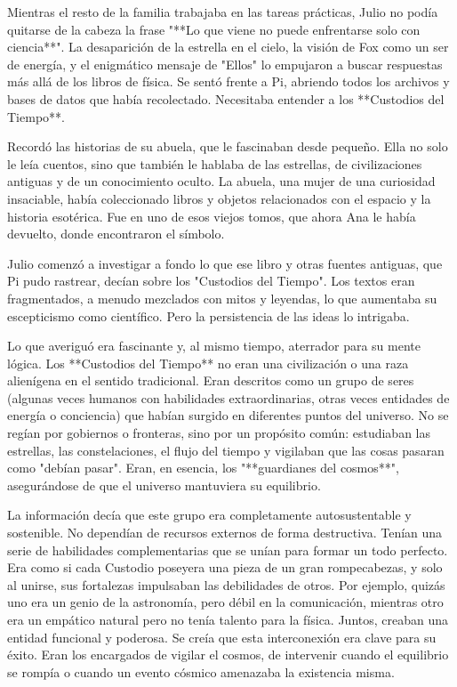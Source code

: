 \documentclass[a4paper,12pt]{book}
\begin{document}
Mientras el resto de la familia trabajaba en las tareas prácticas, Julio no podía quitarse de la cabeza la frase "**Lo que viene no puede enfrentarse solo con ciencia**". La desaparición de la estrella en el cielo, la visión de Fox como un ser de energía, y el enigmático mensaje de "Ellos" lo empujaron a buscar respuestas más allá de los libros de física. Se sentó frente a Pi, abriendo todos los archivos y bases de datos que había recolectado. Necesitaba entender a los **Custodios del Tiempo**.

Recordó las historias de su abuela, que le fascinaban desde pequeño. Ella no solo le leía cuentos, sino que también le hablaba de las estrellas, de civilizaciones antiguas y de un conocimiento oculto. La abuela, una mujer de una curiosidad insaciable, había coleccionado libros y objetos relacionados con el espacio y la historia esotérica. Fue en uno de esos viejos tomos, que ahora Ana le había devuelto, donde encontraron el símbolo.

Julio comenzó a investigar a fondo lo que ese libro y otras fuentes antiguas, que Pi pudo rastrear, decían sobre los "Custodios del Tiempo". Los textos eran fragmentados, a menudo mezclados con mitos y leyendas, lo que aumentaba su escepticismo como científico. Pero la persistencia de las ideas lo intrigaba.

Lo que averiguó era fascinante y, al mismo tiempo, aterrador para su mente lógica. Los **Custodios del Tiempo** no eran una civilización o una raza alienígena en el sentido tradicional. Eran descritos como un grupo de seres (algunas veces humanos con habilidades extraordinarias, otras veces entidades de energía o conciencia) que habían surgido en diferentes puntos del universo. No se regían por gobiernos o fronteras, sino por un propósito común: estudiaban las estrellas, las constelaciones, el flujo del tiempo y vigilaban que las cosas pasaran como "debían pasar". Eran, en esencia, los "**guardianes del cosmos**", asegurándose de que el universo mantuviera su equilibrio.

La información decía que este grupo era completamente autosustentable y sostenible. No dependían de recursos externos de forma destructiva. Tenían una serie de habilidades complementarias que se unían para formar un todo perfecto. Era como si cada Custodio poseyera una pieza de un gran rompecabezas, y solo al unirse, sus fortalezas impulsaban las debilidades de otros. Por ejemplo, quizás uno era un genio de la astronomía, pero débil en la comunicación, mientras otro era un empático natural pero no tenía talento para la física. Juntos, creaban una entidad funcional y poderosa. Se creía que esta interconexión era clave para su éxito. Eran los encargados de vigilar el cosmos, de intervenir cuando el equilibrio se rompía o cuando un evento cósmico amenazaba la existencia misma.
\end{document}
